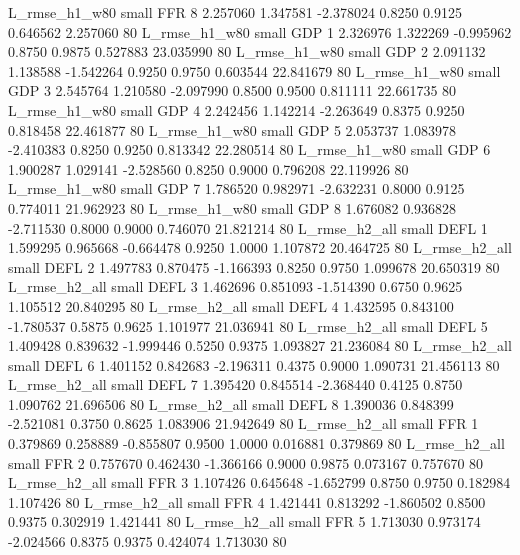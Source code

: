  L_rmse_h1_w80      small      FFR                 8 2.257060 1.347581 -2.378024 0.8250 0.9125  0.646562    2.257060 80
 L_rmse_h1_w80      small      GDP                 1 2.326976 1.322269 -0.995962 0.8750 0.9875  0.527883   23.035990 80
 L_rmse_h1_w80      small      GDP                 2 2.091132 1.138588 -1.542264 0.9250 0.9750  0.603544   22.841679 80
 L_rmse_h1_w80      small      GDP                 3 2.545764 1.210580 -2.097990 0.8500 0.9500  0.811111   22.661735 80
 L_rmse_h1_w80      small      GDP                 4 2.242456 1.142214 -2.263649 0.8375 0.9250  0.818458   22.461877 80
 L_rmse_h1_w80      small      GDP                 5 2.053737 1.083978 -2.410383 0.8250 0.9250  0.813342   22.280514 80
 L_rmse_h1_w80      small      GDP                 6 1.900287 1.029141 -2.528560 0.8250 0.9000  0.796208   22.119926 80
 L_rmse_h1_w80      small      GDP                 7 1.786520 0.982971 -2.632231 0.8000 0.9125  0.774011   21.962923 80
 L_rmse_h1_w80      small      GDP                 8 1.676082 0.936828 -2.711530 0.8000 0.9000  0.746070   21.821214 80
 L_rmse_h2_all      small     DEFL                 1 1.599295 0.965668 -0.664478 0.9250 1.0000  1.107872   20.464725 80
 L_rmse_h2_all      small     DEFL                 2 1.497783 0.870475 -1.166393 0.8250 0.9750  1.099678   20.650319 80
 L_rmse_h2_all      small     DEFL                 3 1.462696 0.851093 -1.514390 0.6750 0.9625  1.105512   20.840295 80
 L_rmse_h2_all      small     DEFL                 4 1.432595 0.843100 -1.780537 0.5875 0.9625  1.101977   21.036941 80
 L_rmse_h2_all      small     DEFL                 5 1.409428 0.839632 -1.999446 0.5250 0.9375  1.093827   21.236084 80
 L_rmse_h2_all      small     DEFL                 6 1.401152 0.842683 -2.196311 0.4375 0.9000  1.090731   21.456113 80
 L_rmse_h2_all      small     DEFL                 7 1.395420 0.845514 -2.368440 0.4125 0.8750  1.090762   21.696506 80
 L_rmse_h2_all      small     DEFL                 8 1.390036 0.848399 -2.521081 0.3750 0.8625  1.083906   21.942649 80
 L_rmse_h2_all      small      FFR                 1 0.379869 0.258889 -0.855807 0.9500 1.0000  0.016881    0.379869 80
 L_rmse_h2_all      small      FFR                 2 0.757670 0.462430 -1.366166 0.9000 0.9875  0.073167    0.757670 80
 L_rmse_h2_all      small      FFR                 3 1.107426 0.645648 -1.652799 0.8750 0.9750  0.182984    1.107426 80
 L_rmse_h2_all      small      FFR                 4 1.421441 0.813292 -1.860502 0.8500 0.9375  0.302919    1.421441 80
 L_rmse_h2_all      small      FFR                 5 1.713030 0.973174 -2.024566 0.8375 0.9375  0.424074    1.713030 80
